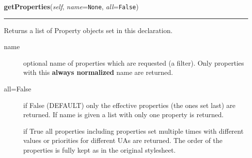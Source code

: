     \vspace{0.5ex}

\hspace{.8\funcindent}\begin{boxedminipage}{\funcwidth}

    \raggedright \textbf{getProperties}(\textit{self}, \textit{name}={\tt None}, \textit{all}={\tt False})

    \vspace{-1.5ex}

    \rule{\textwidth}{0.5\fboxrule}
\setlength{\parskip}{2ex}

Returns a list of Property objects set in this declaration.
\begin{description}
\item[{name}] \leavevmode 
optional name of properties which are requested (a filter).
Only properties with this \textbf{always normalized} name are returned.

\item[{all=False}] \leavevmode 
if False (DEFAULT) only the effective properties (the ones set
last) are returned. If name is given a list with only one property
is returned.

if True all properties including properties set multiple times with
different values or priorities for different UAs are returned.
The order of the properties is fully kept as in the original
stylesheet.

\end{description}
\setlength{\parskip}{1ex}
    \end{boxedminipage}

    \label{cssutils:css:cssstyledeclaration:CSSStyleDeclaration:getProperty}

    \vspace{0.5ex}

